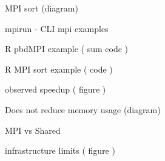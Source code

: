 \begin{frame}
		MPI sort (diagram)
\end{frame}

\begin{frame}
		mpirun - CLI mpi examples
\end{frame}

\begin{frame}
		R pbdMPI example ( sum code )
\end{frame}

\begin{frame}
		R MPI sort example ( code )
\end{frame}

\begin{frame}
		observed speedup ( figure )
\end{frame}

\begin{frame}
		Does not reduce memory usage (diagram)
\end{frame}

\begin{frame}
		MPI vs Shared
\end{frame}

\begin{frame}
		infrastructure limits ( figure )
\end{frame}


